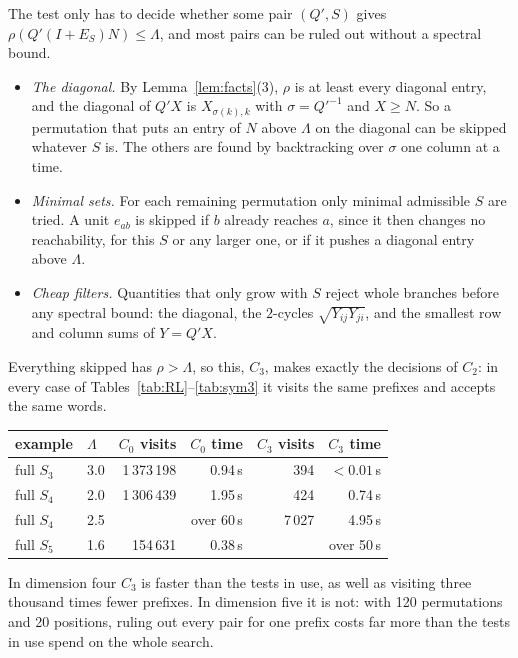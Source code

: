 \documentclass[11pt]{amsart}
\newcommand{\Lam}{\Lambda}
\theoremstyle{plain}
\theoremstyle{definition}
\begin{document}
The test only has to decide whether some pair $(Q',S)$ gives
$\rho(Q'(I+E_S)N)\le\Lam$, and most pairs can be ruled out without a
spectral bound.
\begin{itemize}
\item \emph{The diagonal.}  By Lemma~\ref{lem:facts}(3), $\rho$ is at least
  every diagonal entry, and the diagonal of $Q'X$ is $X_{\sigma(k),k}$ with
  $\sigma=Q'^{-1}$ and $X\ge N$.  So a permutation that puts an entry of
  $N$ above $\Lam$ on the diagonal can be skipped whatever $S$ is.  The
  others are found by backtracking over $\sigma$ one column at a time.
\item \emph{Minimal sets.}  For each remaining permutation only minimal
  admissible $S$ are tried.  A unit $e_{ab}$ is skipped if $b$ already
  reaches $a$, since it then changes no reachability, for this $S$ or any
  larger one, or if it pushes a diagonal entry above $\Lam$.
\item \emph{Cheap filters.}  Quantities that only grow with $S$ reject
  whole branches before any spectral bound: the diagonal, the $2$-cycles
  $\sqrt{Y_{ij}Y_{ji}}$, and the smallest row and column sums of $Y=Q'X$.
\end{itemize}
Everything skipped has $\rho>\Lam$, so this, $C_3$, makes exactly the
decisions of $C_2$: in every case of Tables~\ref{tab:RL}--\ref{tab:sym3} it
visits the same prefixes and accepts the same words.

\begin{center}
  \small
  \begin{tabular}{llrrrr}
    \toprule
    example & $\Lam$ & $C_0$ visits & $C_0$ time & $C_3$ visits & $C_3$ time \\
    \midrule
    full $S_3$ & 3.0 & 1\,373\,198 & 0.94\,s & 394 & $<0.01$\,s \\
    full $S_4$ & 2.0 & 1\,306\,439 & 1.95\,s & 424 & 0.74\,s \\
    full $S_4$ & 2.5 & & over 60\,s & 7\,027 & 4.95\,s \\
    full $S_5$ & 1.6 & 154\,631 & 0.38\,s & & over 50\,s \\
    \bottomrule
  \end{tabular}
\end{center}

In dimension four $C_3$ is faster than the tests in use, as well as
visiting three thousand times fewer prefixes.  In dimension five it is not:
with 120 permutations and 20 positions, ruling out every pair for one
prefix costs far more than the tests in use spend on the whole search.
\end{document}
